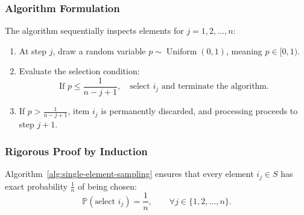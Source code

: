 \subsubsection{Algorithm Formulation}
The algorithm sequentially inspects elements for $j = 1, 2, \dots, n$:
\begin{enumerate}
  \item At step $j$, draw a random variable $p \sim \operatorname{Uniform}(0, 1)$, meaning $p \in [0, 1)$.
  \item Evaluate the selection condition:
  \begin{equation}
    \text{If } p \le \frac{1}{n - j + 1}, \quad \text{select } i_j \text{ and terminate the algorithm.}
    \label{eq:single-item-threshold}
  \end{equation}
  \item If $p > \frac{1}{n - j + 1}$, item $i_j$ is permanently discarded, and processing proceeds to step $j+1$.
\end{enumerate}

\begin{algorithm}[H]
  \caption{Online Single-Item Sampling ($m = 1$, $n$ known)}
  \label{alg:single-element-sampling}
\end{algorithm}

\subsubsection{Rigorous Proof by Induction}
\begin{theorem}
Algorithm~\ref{alg:single-element-sampling} ensures that every element $i_j \in S$ has exact probability $\frac{1}{n}$ of being chosen:
\begin{equation}
  \mathbb{P}(\text{select } i_j) = \frac{1}{n}, \qquad \forall j \in \{1, 2, \dots, n\}.
\end{equation}
\end{theorem}


